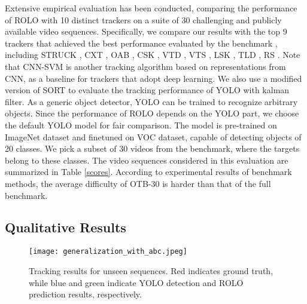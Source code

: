 \documentclass{article}
\begin{document}
Extensive empirical evaluation has been conducted, comparing the performance of ROLO with 10 distinct trackers on a suite of 30 challenging and publicly available video sequences.
Specifically, we compare our results with the top 9 trackers that achieved the best performance evaluated by the benchmark \citep{wu2015object}, including STRUCK \citep{7360205}, CXT \citep{dinh2011context}, OAB \citep{grabner2006real}, CSK \citep{henriques2012exploiting}, VTD \citep{kwon2010visual}, VTS \citep{kwon2011tracking}, LSK \citep{liu2011robust}, TLD \citep{kalal2010pn}, RS \citep{collins2005online}.
Note that CNN-SVM \citep{hong2015tracking} is another tracking algorithm based on representations from CNN, as a baseline for trackers that adopt deep learning.
We also use a modified version of SORT \citep{bewley2015sort} to evaluate the tracking performance of YOLO with kalman filter.
As a generic object detector, YOLO can be trained to recognize arbitrary objects.
Since the performance of ROLO depends on the YOLO part,
we choose the default YOLO model for fair comparison. The model is pre-trained on ImageNet dataset and finetuned on VOC dataset,
capable of detecting objects of 20 classes.
We pick a subset of 30 videos from the benchmark, where the targets belong to these classes.
The video sequences considered in this evaluation are summarized in Table \ref{scores}. According to experimental results of benchmark methods, the average difficulty of OTB-30 is harder than that of the full benchmark.










\subsection{Qualitative Results}
\begin{figure}[h] %
	\tiny
	\captionsetup{justification=centering}
	\texttt{[image: generalization\_with\_abc.jpeg]}
	\caption{Tracking results for unseen sequences. Red indicates ground truth, while blue and green indicate YOLO detection and ROLO prediction results, respectively.}
	\label{fig-Generalization}
\end{figure}
\end{document}
